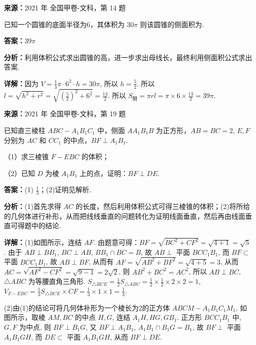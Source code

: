 \begin{question}[points=5]
\textbf{来源：}2021 年 全国甲卷-文科，第 14 题\par
已知一个圆锥的底面半径为6，其体积为 $30\pi$ 则该圆锥的侧面积为.
\fillin[{$39\pi$}]
\begin{solution}
\textbf{答案：}$39\pi$

\textbf{分析：}利用体积公式求出圆锥的高，进一步求出母线长，最终利用侧面积公式求出答案.

\textbf{详解：}因为 $V = \frac{1}{3}\pi \cdot 6^2 \cdot h = 30\pi$, 所以 $h = \frac{5}{2}$. 所以 $l = \sqrt{h^2 + r^2} = \sqrt{\left(\frac{5}{2}\right)^2 + 6^2} = \frac{13}{2}$. 所以 $S_{\text{侧}} = \pi r l = \pi \times 6 \times \frac{13}{2} = 39\pi$.
\end{solution}
\end{question}

\begin{question}[points=12]
\textbf{来源：}2021 年 全国甲卷-文科，第 19 题\par
已知直三棱柱 $ABC-A_1B_1C_1$ 中，侧面 $AA_1B_1B$ 为正方形，$AB=BC=2$, $E, F$ 分别为 $AC$ 和 $CC_1$ 的中点，$BF \perp A_1B_1$.



（1）求三棱锥 $F-EBC$ 的体积；



（2）已知 $D$ 为棱 $A_1B_1$ 上的点，证明：$BF \perp DE$.
\begin{solution}
\textbf{答案：}(1) $\frac{1}{3}$；(2)证明见解析.

\textbf{分析：}(1)首先求得 $AC$ 的长度，然后利用体积公式可得三棱锥的体积；(2)将所给的几何体进行补形，从而把线线垂直的问题转化为证明线面垂直，然后再由线面垂直可得题中的结论.

\textbf{详解：}(1)如图所示，连结 $AF$. 由题意可得：$BF = \sqrt{BC^2 + CF^2} = \sqrt{4+1} = \sqrt{5}$. 由于 $AB \perp BB_1$, $BC \perp AB$, $BB_1 \cap BC = B$, 故 $AB \perp$ 平面 $BCC_1B_1$, 而 $BF \subset$ 平面 $BCC_1B_1$, 故 $AB \perp BF$, 从而有 $AF = \sqrt{AB^2 + BF^2} = \sqrt{4+5} = 3$, 从而 $AC = \sqrt{AF^2 - CF^2} = \sqrt{9-1} = 2\sqrt{2}$, 则 $AB^2 + BC^2 = AC^2$, 所以 $AB \perp BC$, $\triangle ABC$ 为等腰直角三角形. $S_{\triangle BCE} = \frac{1}{2} S_{\triangle ABC} = \frac{1}{2} \times \frac{1}{2} \times 2 \times 2 = 1$, $V_{F-EBC} = \frac{1}{3} S_{\triangle BCE} \times CF = \frac{1}{3} \times 1 \times 1 = \frac{1}{3}$.

(2)由(1)的结论可将几何体补形为一个棱长为2的正方体 $ABCM-A_1B_1C_1M_1$, 如图所示，取棱 $AM, BC$ 的中点 $H, G$, 连结 $A_1H, HG, GB_1$. 正方形 $BCC_1B_1$ 中, $G, F$ 为中点, 则 $BF \perp B_1G$, 又 $BF \perp A_1B_1$, $A_1B_1 \cap B_1G = B_1$, 故 $BF \perp$ 平面 $A_1B_1GH$, 而 $DE \subset$ 平面 $A_1B_1GH$, 从而 $BF \perp DE$.
\end{solution}
\end{question}

